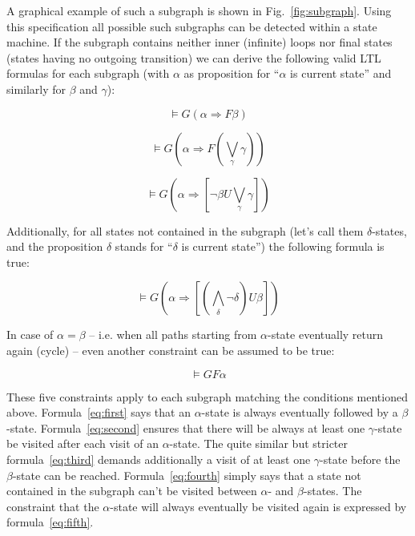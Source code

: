 \documentclass[conference]{IEEEtran}
\begin{document}
A graphical example of such a subgraph is shown in Fig.~\ref{fig:subgraph}. Using this specification all possible such subgraphs can be detected within a state machine. If the subgraph contains neither inner (infinite) loops nor final states (states having no outgoing transition) we can derive the following valid LTL formulas for each subgraph (with $\alpha$ as proposition for ``$\alpha$ is current state'' and similarly for $\beta$ and $\gamma$):

\begin{equation} \label{eq:first}
  \models G (\alpha \Rightarrow F \beta)
\end{equation}

\begin{equation} \label{eq:second}
  \models G (\alpha \Rightarrow F (\bigvee_{\gamma} \gamma))
\end{equation}

\begin{equation} \label{eq:third}
  \models G (\alpha \Rightarrow [\neg \beta U \bigvee_{\gamma} \gamma])
\end{equation}

Additionally, for all states not contained in the subgraph (let's call them $\delta$-states, and the proposition $\delta$ stands for ``$\delta$ is current state'') the following formula is true: 

\begin{equation} \label{eq:fourth}
  \models G (\alpha \Rightarrow [(\bigwedge_{\delta} \neg \delta) U \beta])
\end{equation}

In case of $\alpha = \beta$ -- i.e. when all paths starting from $\alpha$-state eventually return again (cycle) -- even another constraint can be assumed to be true:

\begin{equation} \label{eq:fifth}
  \models G F \alpha
\end{equation}
 

These five constraints apply to each subgraph matching the conditions mentioned above. Formula~\ref{eq:first} says that an $\alpha$-state is always eventually followed by a $\beta$-state. Formula~\ref{eq:second} ensures that there will be always at least one $\gamma$-state be visited after each visit of an $\alpha$-state. The quite similar but stricter formula~\ref{eq:third} demands additionally a visit of at least one $\gamma$-state before the $\beta$-state can be reached. Formula~\ref{eq:fourth} simply says that a state not contained in the subgraph can't be visited between $\alpha$- and $\beta$-states. The constraint that the $\alpha$-state will always eventually be visited again is expressed by formula~\ref{eq:fifth}.
\end{document}
